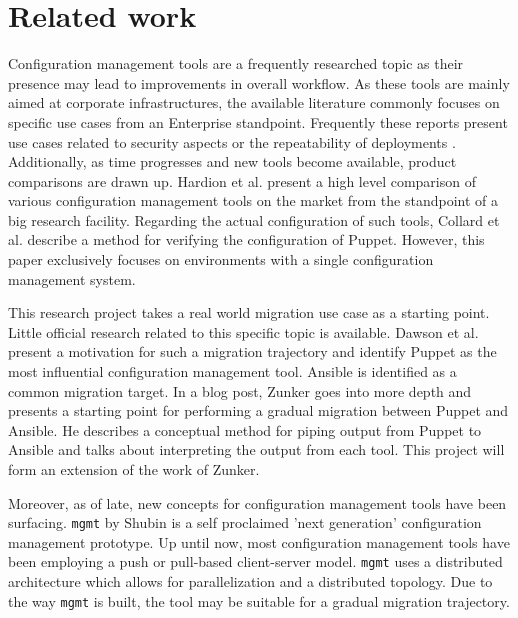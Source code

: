 \section{Related work}\label{sec:relatedwork}
Configuration management tools are a frequently researched topic as their presence may lead to improvements in overall workflow. As these tools are mainly aimed at corporate infrastructures, the available literature commonly focuses on specific use cases from an Enterprise standpoint. Frequently these reports present use cases related to security aspects \cite{dotson2014security} or the repeatability of deployments \cite{ruiz2015reconstructable}. Additionally, as time progresses and new tools become available, product comparisons are drawn up. Hardion et al. \cite{Hardion2013} present a high level comparison of various configuration management tools on the market from the standpoint of a big research facility. Regarding the actual configuration of such tools, Collard et al. \cite{Collard2015} describe a method for verifying the configuration of Puppet. However, this paper exclusively focuses on environments with a single configuration management system. 

This research project takes a real world migration use case as a starting point. Little official research related to this specific topic is available. Dawson et al. \cite{dawson_hall_hecht_2014} present a motivation for such a migration trajectory and identify Puppet as the most influential configuration management tool. Ansible is identified as a common migration target. In a blog post, Zunker \cite{zunker_2014} goes into more depth and presents a starting point for performing a gradual migration between Puppet and Ansible. He describes a conceptual method for piping output from Puppet to Ansible and talks about interpreting the output from each tool. This project will form an extension of the work of Zunker.   

Moreover, as of late, new concepts for configuration management tools have been surfacing. \texttt{mgmt} by Shubin \cite{shubin2016} is a self proclaimed 'next generation' configuration management prototype.  Up until now, most configuration management tools have been employing a push or pull-based client-server model. \texttt{mgmt} uses a distributed architecture which allows for parallelization and a distributed topology. Due to the way \texttt{mgmt} is built, the tool may be suitable for a gradual migration trajectory. 
